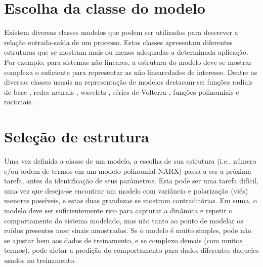 \section{Escolha da classe do modelo}\label{sec:escolha_modelo}

Existem diversas classes modelos que podem ser utilizados para descrever a relação entrada-saída de um processo. Estas classes apresentam diferentes estruturas que se mostram mais ou menos adequadas a determinada aplicação. Por exemplo, para sistemas não lineares, a estrutura do modelo deve se mostrar complexa o suficiente para representar as não linearedades de interesse. Dentre as diversas classes usuais na representação de modelos destacam-se: funções radiais de base \citep{broomhead1988}, redes neurais \citep{haykin1994}, wavelets \citep{strang1989}, séries de Volterra \citep{billings1980}, funções polinomiais e racionais \citep{billings1989}.

\section{Seleção de estrutura}\label{sec:estr_selection}

Uma vez definida a classe de um modelo, a escolha de sua estrutura (i.e., número e/ou ordem de termos em um modelo polinomial NARX) passa a ser a próxima tarefa, antes da identificação de seus parâmetros.
Esta pode ser uma tarefa difícil, uma vez que deseja-se encontrar um modelo com variância e polarização (viés) menores possíveis, e estas duas grandezas se mostram contraditórias. 
Em suma, o modelo deve ser suficientemente rico para capturar a dinâmica e repetir o comportamento do sistema modelado, mas não tanto ao ponto de modelar os ruídos  presentes nosc sinais amostrados.
Se o modelo é muito simples, pode não se ajustar bem aos dados de treinamento, e se complexo demais (com muitos termos), pode afetar a predição do comportamento para dados diferentes daqueles usados no treinamento.



